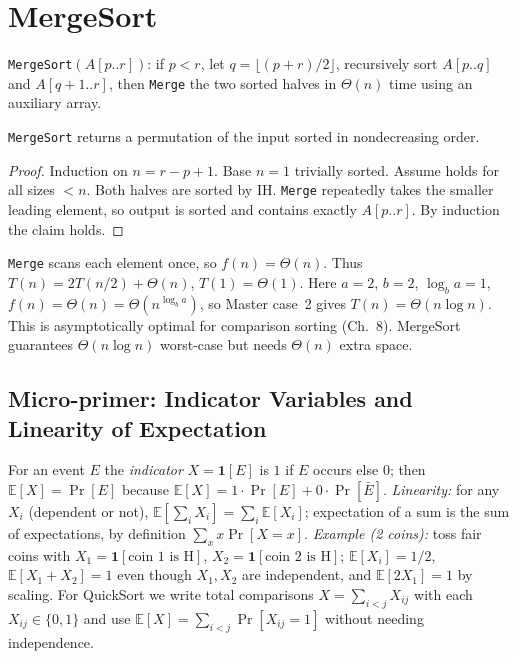\section{MergeSort}
\label{sec:mergesort}

\texttt{MergeSort}$(A[p..r])$: if $p<r$, let $q=\lfloor(p+r)/2\rfloor$, recursively sort $A[p..q]$ and $A[q+1..r]$, then \texttt{Merge} the two sorted halves in $\Theta(n)$ time using an auxiliary array.

\begin{theorem}
\texttt{MergeSort} returns a permutation of the input sorted in nondecreasing order.
\end{theorem}
\begin{proof}
Induction on $n=r-p+1$. Base $n=1$ trivially sorted. Assume holds for all sizes $<n$. Both halves are sorted by IH. \texttt{Merge} repeatedly takes the smaller leading element, so output is sorted and contains exactly $A[p..r]$. By induction the claim holds.
\end{proof}

\texttt{Merge} scans each element once, so $f(n)=\Theta(n)$. Thus $T(n)=2T(n/2)+\Theta(n)$, $T(1)=\Theta(1)$. Here $a=2$, $b=2$, $\log_b a=1$, $f(n)=\Theta(n)=\Theta(n^{\log_b a})$, so Master case~2 gives $T(n)=\Theta(n\log n)$. This is asymptotically optimal for comparison sorting (Ch.~8). MergeSort guarantees $\Theta(n\log n)$ worst-case but needs $\Theta(n)$ extra space.

\subsection*{Micro-primer: Indicator Variables and Linearity of Expectation}
\label{sec:prob-primer}
For an event $E$ the \emph{indicator} $X=\mathbf{1}[E]$ is $1$ if $E$ occurs else $0$; then $\mathbb{E}[X]=\Pr[E]$ because $\mathbb{E}[X]=1\cdot\Pr[E]+0\cdot\Pr[\bar E]$. \emph{Linearity:} for any $X_i$ (dependent or not), $\mathbb{E}[\sum_i X_i]=\sum_i\mathbb{E}[X_i]$; expectation of a sum is the sum of expectations, by definition $\sum_x x\Pr[X=x]$.
\emph{Example (2 coins):} toss fair coins with $X_1=\mathbf{1}[\text{coin 1 is H}]$, $X_2=\mathbf{1}[\text{coin 2 is H}]$; $\mathbb{E}[X_i]=1/2$, $\mathbb{E}[X_1+X_2]=1$ even though $X_1,X_2$ are independent, and $\mathbb{E}[2X_1]=1$ by scaling. For QuickSort we write total comparisons $X=\sum_{i<j}X_{ij}$ with each $X_{ij}\in\{0,1\}$ and use $\mathbb{E}[X]=\sum_{i<j}\Pr[X_{ij}=1]$ without needing independence.

